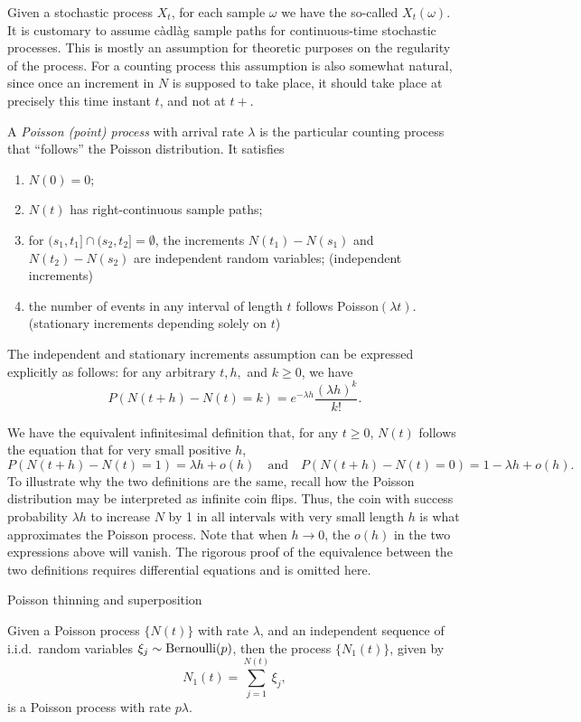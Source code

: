 \documentclass[10pt]{book}
\begin{document}
Given a stochastic process $X_t$, for each sample $\omega$ we have the so-called  $X_t(\omega)$. It is customary to assume càdlàg sample paths for continuous-time stochastic processes. This is mostly an assumption for theoretic purposes on the regularity of the process. For a counting process this assumption is also somewhat natural, since once an increment in $N$ is supposed to take place, it should take place at precisely this time instant $t$, and not at $t+$.

A \emph{Poisson (point) process} with arrival rate $\lambda$ is the particular counting process that “follows” the Poisson distribution. It satisfies 
\begin{enumerate}

\item $N(0)=0$;

\item $N(t)$ has right-continuous sample paths;

\item for $(s_{1},t_{1}]\cap (s_{2},t_{2}]= \emptyset$, the increments $N(t_{1})- N(s_{1})$ and $N(t_{2})- N(s_{2})$ are independent random variables; (independent increments)

\item the number of events in any interval of length $t$ follows Poisson$(\lambda t)$. (stationary increments depending solely on $t$)

\end{enumerate}


The independent and stationary increments assumption can be expressed explicitly as follows: for any arbitrary $t,h,$ and $k\geq 0$, we have 
\[
P(N(t+h)- N(t)=k)=e^{-\lambda h}\frac{(\lambda h)^{k}}{k!}.
\]

We have the equivalent infinitesimal definition that, for any $t\geq 0$, $N(t)$ follows the equation that for very small positive $h$, \[P(N(t+h)- N(t)=1)=\lambda h+o(h) \quad \text{and} \quad  P(N(t+h)- N(t)=0)=1- \lambda h+o(h).\]
To illustrate why the two definitions are the same, recall how the Poisson distribution may be interpreted as infinite coin flips. Thus, the coin with success probability $\lambda h$ to increase $N$ by 1 in all intervals with very small length $h$ is what approximates the Poisson process. Note that when $h\rightarrow 0$, the $o(h)$ in the two expressions above will vanish. The rigorous proof of the equivalence between the two definitions requires differential equations and is omitted here.

Poisson thinning and superposition
\begin{thm}
    Given a Poisson process $\{N(t)\}$ with rate $\lambda$, and an independent sequence of i.i.d.\ random variables $\xi_j \sim \operatorname{Bernoulli}(p)$, then the process $\{N_1(t)\}$, given by \[
        N_1(t) = \sum_{j=1}^{N(t)} \xi_j,
    \] is a Poisson process with rate $p\lambda$.
\end{thm}
\end{document}
